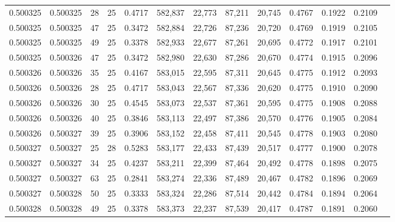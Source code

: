 \begin{tabular}{rrrrrrrrrrrrr}
0.500325 & 0.500325 &    28 &  25 &                                     0.4717 & 582,837 &  22,773 &  87,211 &  20,745 & 0.4767 & 0.1922 & 0.2109 \\
0.500325 & 0.500325 &    47 &  25 &                                     0.3472 & 582,884 &  22,726 &  87,236 &  20,720 & 0.4769 & 0.1919 & 0.2105 \\
0.500325 & 0.500325 &    49 &  25 &                                     0.3378 & 582,933 &  22,677 &  87,261 &  20,695 & 0.4772 & 0.1917 & 0.2101 \\
0.500325 & 0.500326 &    47 &  25 &                                     0.3472 & 582,980 &  22,630 &  87,286 &  20,670 & 0.4774 & 0.1915 & 0.2096 \\
0.500326 & 0.500326 &    35 &  25 &                                     0.4167 & 583,015 &  22,595 &  87,311 &  20,645 & 0.4775 & 0.1912 & 0.2093 \\
0.500326 & 0.500326 &    28 &  25 &                                     0.4717 & 583,043 &  22,567 &  87,336 &  20,620 & 0.4775 & 0.1910 & 0.2090 \\
0.500326 & 0.500326 &    30 &  25 &                                     0.4545 & 583,073 &  22,537 &  87,361 &  20,595 & 0.4775 & 0.1908 & 0.2088 \\
0.500326 & 0.500326 &    40 &  25 &                                     0.3846 & 583,113 &  22,497 &  87,386 &  20,570 & 0.4776 & 0.1905 & 0.2084 \\
0.500326 & 0.500327 &    39 &  25 &                                     0.3906 & 583,152 &  22,458 &  87,411 &  20,545 & 0.4778 & 0.1903 & 0.2080 \\
0.500327 & 0.500327 &    25 &  28 &                                     0.5283 & 583,177 &  22,433 &  87,439 &  20,517 & 0.4777 & 0.1900 & 0.2078 \\
0.500327 & 0.500327 &    34 &  25 &                                     0.4237 & 583,211 &  22,399 &  87,464 &  20,492 & 0.4778 & 0.1898 & 0.2075 \\
0.500327 & 0.500327 &    63 &  25 &                                     0.2841 & 583,274 &  22,336 &  87,489 &  20,467 & 0.4782 & 0.1896 & 0.2069 \\
0.500327 & 0.500328 &    50 &  25 &                                     0.3333 & 583,324 &  22,286 &  87,514 &  20,442 & 0.4784 & 0.1894 & 0.2064 \\
0.500328 & 0.500328 &    49 &  25 &                                     0.3378 & 583,373 &  22,237 &  87,539 &  20,417 & 0.4787 & 0.1891 & 0.2060 \\

\end{tabular}
